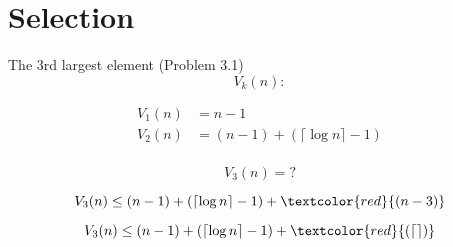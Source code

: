 \section{Selection}

\begin{frame}{The $3$rd largest element (Problem 3.1)}
  \[
	V_k(n): \text{}
  \]

  \pause
  \begin{align*}
	V_1(n) &= n - 1 \\
	V_2(n) &= (n - 1) + (\lceil \log n \rceil - 1) \\
  \end{align*}

  \pause
  \[
	V_3(n) = ?
  \]

  \pause
  \[
	V_3(n) \le (n - 1) + (\lceil \log n \rceil - 1) + \textcolor{red}{(n - 3)}
  \]

  \pause
  \[
	V_3(n) \le (n - 1) + (\lceil \log n \rceil - 1) + \textcolor{red}{(\lceil \rceil)} 
  \]
\end{frame}
% 
% 
